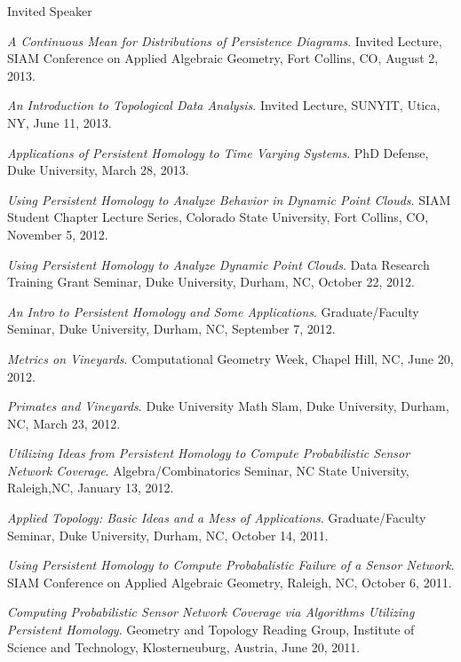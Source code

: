 \documentclass{resume} %
\begin{document}
\begin{rSection}{Invited Speaker}
\begin{etaremune}
\item\emph{A Continuous Mean for Distributions of Persistence Diagrams}. Invited Lecture, SIAM Conference on Applied Algebraic Geometry, Fort Collins, CO, August 2, 2013. 

\item\emph{An Introduction to Topological Data Analysis}. Invited Lecture, SUNYIT, Utica, NY, June 11, 2013. 

\item\emph{Applications of Persistent Homology to Time Varying Systems}. PhD Defense, Duke University, March 28, 2013. 

\item\emph{Using Persistent Homology to Analyze Behavior in Dynamic Point Clouds}. SIAM Student Chapter Lecture Series, Colorado State University, Fort Collins, CO, November 5, 2012. 

\item\emph{Using Persistent Homology to Analyze Dynamic Point Clouds}. Data Research Training Grant Seminar, Duke University, Durham, NC, October 22, 2012. 

\item\emph{An Intro to Persistent Homology and Some Applications}. Graduate/Faculty Seminar, Duke University, Durham, NC, September 7, 2012. 

\item\emph{Metrics on Vineyards}. Computational Geometry Week, Chapel Hill, NC, June 20, 2012. 

\item\emph{Primates and Vineyards}. Duke University Math Slam, Duke University, Durham, NC, March 23, 2012. 

\item\emph{Utilizing Ideas from Persistent Homology to Compute Probabilistic Sensor Network Coverage}. Algebra/Combinatorics Seminar, NC State University, Raleigh,NC, January 13, 2012. 

\item\emph{Applied Topology: Basic Ideas and a Mess of Applications}. Graduate/Faculty Seminar, Duke University, Durham, NC, October 14, 2011. 

\item\emph{Using Persistent Homology to Compute Probabalistic Failure of a Sensor Network}. SIAM Conference on Applied Algebraic Geometry, Raleigh, NC, October 6, 2011. 

\item\emph{Computing Probabilistic Sensor Network Coverage via Algorithms Utilizing Persistent Homology}. Geometry and Topology Reading Group, Institute of Science and Technology, Klosterneuburg, Austria, June 20, 2011. 


\end{etaremune}
\end{rSection}
\end{document}
